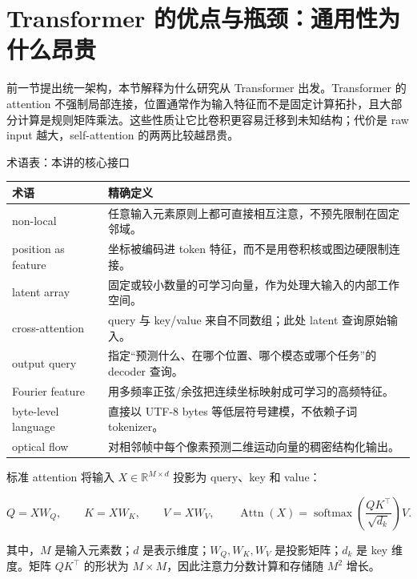 \section{Transformer 的优点与瓶颈：通用性为什么昂贵}

前一节提出统一架构，本节解释为什么研究从 Transformer 出发。Transformer 的 attention 不强制局部连接，位置通常作为输入特征而不是固定计算拓扑，且大部分计算是规则矩阵乘法。这些性质让它比卷积更容易迁移到未知结构；代价是 raw input 越大，self-attention 的两两比较越昂贵。


\begin{knowledgebox}{术语表：本讲的核心接口}
\begin{tabularx}{\textwidth}{L{0.23\textwidth}X}
\toprule
术语 & 精确定义 \\
\midrule
non-local & 任意输入元素原则上都可直接相互注意，不预先限制在固定邻域。 \\
position as feature & 坐标被编码进 token 特征，而不是用卷积核或图边硬限制连接。 \\
latent array & 固定或较小数量的可学习向量，作为处理大输入的内部工作空间。 \\
cross-attention & query 与 key/value 来自不同数组；此处 latent 查询原始输入。 \\
output query & 指定“预测什么、在哪个位置、哪个模态或哪个任务”的 decoder 查询。 \\
Fourier feature & 用多频率正弦/余弦把连续坐标映射成可学习的高频特征。 \\
byte-level language & 直接以 UTF-8 bytes 等低层符号建模，不依赖子词 tokenizer。 \\
optical flow & 对相邻帧中每个像素预测二维运动向量的稠密结构化输出。 \\
\bottomrule
\end{tabularx}
\end{knowledgebox}

标准 attention 将输入 $X\in\mathbb{R}^{M\times d}$ 投影为 query、key 和 value：

\[
Q=XW_Q,\qquad K=XW_K,\qquad V=XW_V,
\qquad
\operatorname{Attn}(X)=\operatorname{softmax}\!\left(\frac{QK^\top}{\sqrt{d_k}}\right)V.
\]

其中，$M$ 是输入元素数；$d$ 是表示维度；$W_Q,W_K,W_V$ 是投影矩阵；$d_k$ 是 key 维度。矩阵 $QK^\top$ 的形状为 $M\times M$，因此注意力分数计算和存储随 $M^2$ 增长。

